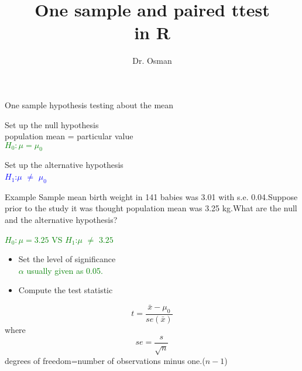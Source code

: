 \documentclass[xcolor=dvipsnames]{beamer}
\author{Dr. Osman}
\begin{document}


\title{\textbf{One sample and paired ttest  \\
in R}}

\titlepage{}

\begin{frame}{One sample hypothesis testing about the mean}


\begin{enumerate}
\begin{pause}
\item Set up the null hypothesis \\
 \hspace{7mm}population mean = particular value  \\
  \hspace{7 mm}\textcolor{green}{$H_0: \mu=\mu_0$}
\end{pause}
\begin{pause}
 \item Set up the alternative hypothesis \\
  \hspace{7mm}\textcolor{blue}{$H_1$:$\mu$ $\neq$ $\mu_0$}
\end{pause}
 \end{enumerate}


\end{frame}

\begin{frame}{Example}
Sample mean birth weight in 141 babies was 3.01 with s.e. 0.04.Suppose prior to the study it was thought population mean was 3.25 kg.What are the null and the alternative hypothesis?\vspace{7 mm}

\begin{pause}
\hspace{7 mm}\textcolor{green}{$H_0: \mu=3.25$ VS
$H_1$:$\mu$ $\neq$ $3.25$}
\end{pause}
\end{frame}

\begin{frame}{}
\begin{itemize}
\item Set the level of significance \\
\hspace{7 mm} \textcolor{green}{$\alpha$ usually given as 0.05.}
\item Compute the test statistic
\end{itemize}

\begin{equation*}
t=\frac{\bar{x}-\mu_0}{se(\bar{x})}
\end{equation*}
where
\begin{equation*}
se=\frac{s}{\sqrt{n}}
\end{equation*}
degrees of freedom=number of observations minus one.($n-1$)
\end{frame}
\end{document}
